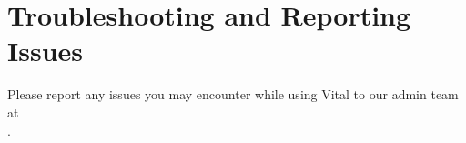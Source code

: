 \documentclass[12pt]{article}
\newcommand{\MYhref}[3][blue]{\href{#2}{\color{#1}{#3}}}%
\begin{document}
\section*{Troubleshooting and Reporting Issues}
Please report any issues you may encounter while using Vital to our admin team at \\ \MYhref{mailto:vital@nyu.edu}{vital@nyu.edu}.

 
\end{document}
